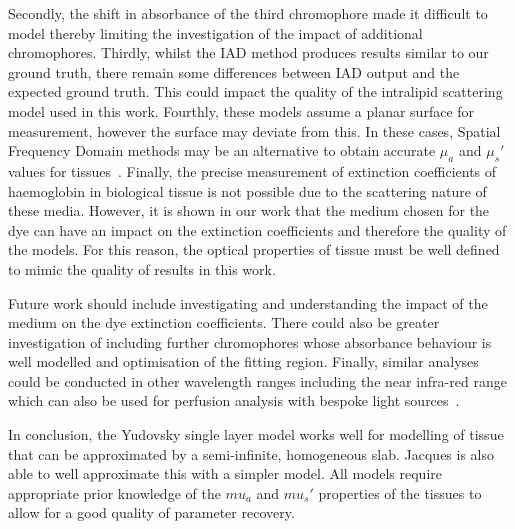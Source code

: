 %
Secondly, the shift in absorbance of the third chromophore made it difficult to model thereby limiting the investigation of the impact of additional chromophores.
%
Thirdly, whilst the IAD method produces results similar to our ground truth, there remain some differences between IAD output and the expected ground truth.
This could impact the quality of the intralipid scattering model used in this work.
%
Fourthly, these models assume a planar surface for measurement, however the surface may deviate from this. In these cases, Spatial Frequency Domain methods may be an alternative to obtain accurate $\mu_a$ and $\mu_s'$ values for tissues~\citep{Gioux2019}. 
Finally, the precise measurement of extinction coefficients of haemoglobin in biological tissue is not possible due to the scattering nature of these media.
However, it is shown in our work that the medium chosen for the dye can have an impact on the extinction coefficients and therefore the quality of the models. For this reason, the optical properties of tissue must be well defined to mimic the quality of results in this work.

Future work should include 
investigating and understanding the impact of the medium on the dye extinction coefficients.
There could also be greater investigation of including further chromophores whose absorbance behaviour is well modelled and optimisation of the fitting region. 
Finally, similar analyses could be conducted in other wavelength ranges including the near infra-red range which can also be used for perfusion analysis with bespoke light sources~\citep{Hummler2020}.

In conclusion, the Yudovsky single layer model works well for modelling of tissue that can be approximated by a semi-infinite, homogeneous slab. Jacques is also able to well approximate this with a simpler model. All models require appropriate prior knowledge of the $mu_a$ and $mu_s'$ properties of the tissues to allow for a good quality of parameter recovery.

